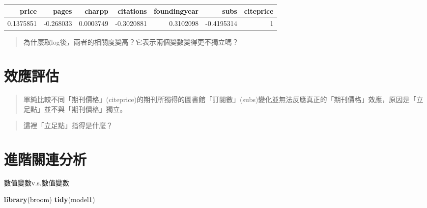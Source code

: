\documentclass[]{article}
\newenvironment{Shaded}{\begin{snugshade}}{\end{snugshade}}
\newcommand{\KeywordTok}[1]{\textcolor[rgb]{0.13,0.29,0.53}{\textbf{#1}}}
\newcommand{\DataTypeTok}[1]{\textcolor[rgb]{0.13,0.29,0.53}{#1}}
\newcommand{\StringTok}[1]{\textcolor[rgb]{0.31,0.60,0.02}{#1}}
\newcommand{\OperatorTok}[1]{\textcolor[rgb]{0.81,0.36,0.00}{\textbf{#1}}}
\newcommand{\NormalTok}[1]{#1}
\begin{document}
\begin{longtable}[]{@{}rrrrrrr@{}}
\toprule
price & pages & charpp & citations & foundingyear & subs &
citeprice\tabularnewline
\midrule
\endhead
0.1375851 & -0.268033 & 0.0003749 & -0.3020881 & 0.3102098 & -0.4195314
& 1\tabularnewline
\bottomrule
\end{longtable}

\begin{Shaded}
\end{Shaded}

\begin{quote}
為什麼取log後，兩者的相關度變高？它表示兩個變數變得更不獨立嗎？
\end{quote}

\section{效應評估}

\begin{quote}
單純比較不同「期刊價格」(citeprice)的期刊所獨得的圖書館「訂閱數」(subs)變化並無法反應真正的「期刊價格」效應，原因是「立足點」並不與「期刊價格」獨立。
\end{quote}

\begin{quote}
這裡「立足點」指得是什麼？
\end{quote}

\section{進階關連分析}

數值變數v.s.數值變數

\begin{Shaded}
\begin{Highlighting}[]
\KeywordTok{library}\NormalTok{(broom)}
\KeywordTok{tidy}\NormalTok{(model1)}
\end{Highlighting}
\end{Shaded}
\end{document}

